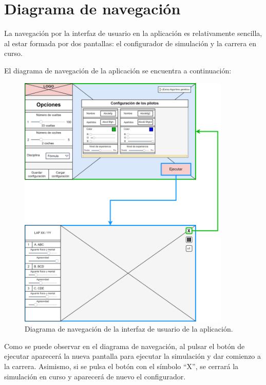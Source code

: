 \section{Diagrama de navegación}

La navegación por la interfaz de usuario en la aplicación es relativamente sencilla, al estar formada por dos pantallas: el configurador de simulación y la carrera en curso.

\bigskip

El diagrama de navegación de la aplicación se encuentra a continuación:

\begin{figure}[H]
    \centering
    \includegraphics[width=0.9\textwidth]{imagenes/nav.png}
    \caption{Diagrama de navegación de la interfaz de usuario de la aplicación.}
\end{figure}

Como se puede observar en el diagrama de navegación, al pulsar el botón de ejecutar aparecerá la nueva pantalla para ejecutar la simulación y dar comienzo a la carrera. Asimismo, si se pulsa el botón con el símbolo ``X'', se cerrará la simulación en curso y aparecerá de nuevo el configurador.
